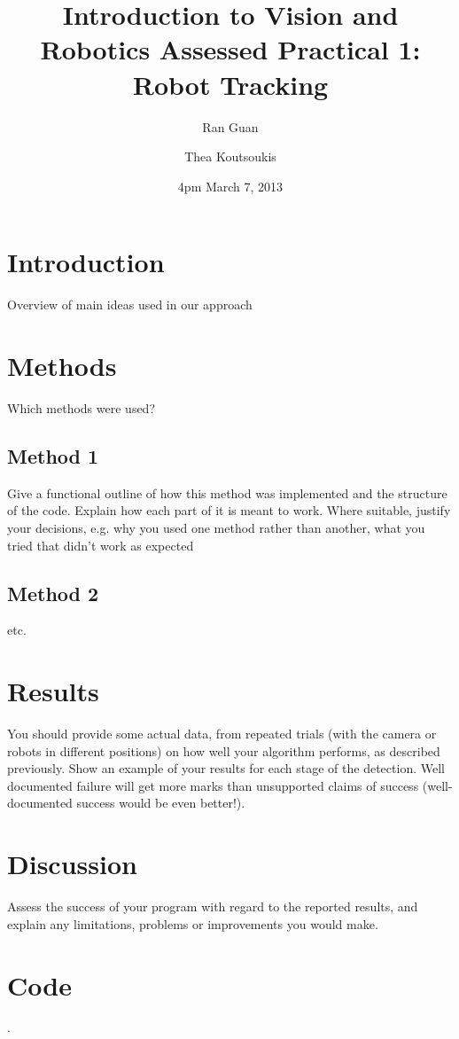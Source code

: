 \documentclass{report}
\title{\bf Introduction to Vision and Robotics Assessed Practical 1: Robot Tracking}  %
\author{
	Ran Guan\\
	\and
	Thea Koutsoukis\\            %
}
\date{4pm March 7, 2013}                           %
\begin{document}
\maketitle                              %
\setcounter{page}{2}                    %
\tableofcontents         
\renewcommand{\chaptername}{}               %

\chapter{Introduction}                %
Overview of main ideas used in our approach
 

\chapter{Methods}                %

Which methods were used? 
 
\section{Method 1}                  %
Give a functional outline of how this method was implemented and the structure of the code. Explain how each part of it is meant to work. Where suitable, justify your
decisions, e.g. why you used one method rather than another, what you tried
that didn't work as expected

\section{Method 2}                  %
etc.

\chapter{Results}                %
You should provide some actual data, from repeated trials (with the
camera or robots in different positions) on how well your algorithm performs,
as described previously. Show an example of your results for each stage of
the detection. Well documented failure will get more marks than unsupported
claims of success (well-documented success would be even better!).


\chapter{Discussion}                %
Assess the success of your program with regard to the reported results, and explain any limitations, problems or improvements you would make.

\chapter{Code}

.
 
\end{document}

